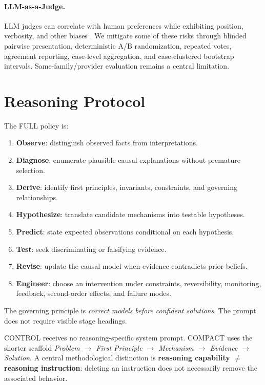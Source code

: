 \documentclass[11pt]{article}
\begin{document}
\paragraph{LLM-as-a-Judge.}
LLM judges can correlate with human preferences while exhibiting position, verbosity, and other biases \citep{zheng2023judge,shi2025judges}. We mitigate some of these risks through blinded pairwise presentation, deterministic A/B randomization, repeated votes, agreement reporting, case-level aggregation, and case-clustered bootstrap intervals. Same-family/provider evaluation remains a central limitation.

\section{Reasoning Protocol}
The FULL policy is:
\begin{enumerate}[leftmargin=*]
\item \textbf{Observe}: distinguish observed facts from interpretations.
\item \textbf{Diagnose}: enumerate plausible causal explanations without premature selection.
\item \textbf{Derive}: identify first principles, invariants, constraints, and governing relationships.
\item \textbf{Hypothesize}: translate candidate mechanisms into testable hypotheses.
\item \textbf{Predict}: state expected observations conditional on each hypothesis.
\item \textbf{Test}: seek discriminating or falsifying evidence.
\item \textbf{Revise}: update the causal model when evidence contradicts prior beliefs.
\item \textbf{Engineer}: choose an intervention under constraints, reversibility, monitoring, feedback, second-order effects, and failure modes.
\end{enumerate}
The governing principle is \emph{correct models before confident solutions}. The prompt does not require visible stage headings.

CONTROL receives no reasoning-specific system prompt. COMPACT uses the shorter scaffold \emph{Problem $\rightarrow$ First Principle $\rightarrow$ Mechanism $\rightarrow$ Evidence $\rightarrow$ Solution}. A central methodological distinction is \textbf{reasoning capability $\neq$ reasoning instruction}: deleting an instruction does not necessarily remove the associated behavior.
\end{document}
